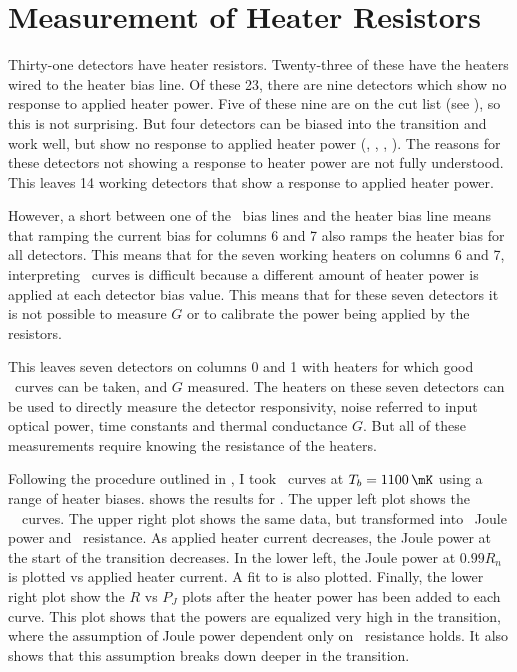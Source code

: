 \section{Measurement of Heater Resistors} \label{sec:heater-r}

Thirty-one detectors have heater resistors.
Twenty-three of these have the heaters wired to the heater bias line.
Of these 23, there are nine detectors which show no response to applied heater power.
Five of these nine are on the cut list (see ), so this is not surprising.
But four detectors can be biased into the transition and work well, but show no response to applied heater power (, , , ).
The reasons for these detectors not showing a response to heater power are not fully understood.
This leaves 14 working detectors that show a response to applied heater power.

However, a short between one of the \TES\ bias lines and the heater bias line means that ramping the current bias for columns 6 and 7 also ramps the heater bias for all detectors.
This means that for the seven working heaters on columns 6 and 7, interpreting \IV\ curves is difficult because a different amount of heater power is applied at each detector bias value.
This means that for these seven detectors it is not possible to measure $G$ or to calibrate the power being applied by the resistors.

This leaves seven detectors on columns 0 and 1 with heaters for which good \IV\ curves can be taken, and $G$ measured.
The heaters on these seven detectors can be used to directly measure the detector responsivity, noise referred to input optical power, time constants and thermal conductance $G$.
But all of these measurements require knowing the resistance of the heaters.

Following the procedure outlined in , I took \IV\ curves at $T_b = \SI{1100}{\mK}$ using a range of heater biases.
 shows the results for .
The upper left plot shows the \TES\ \IV\ curves.
The upper right plot shows the same data, but transformed into \TES\ Joule power and \TES\ resistance.
As applied heater current decreases, the Joule power at the start of the transition decreases.
In the lower left, the Joule power at $0.99R_{n}$ is plotted vs applied heater current.
A fit to  is also plotted.
Finally, the lower right plot show the $R$ vs $P_J$ plots after the heater power has been added to each curve.
This plot shows that the powers are equalized very high in the transition, where the assumption of Joule power dependent only on \TES\ resistance holds.
It also shows that this assumption breaks down deeper in the transition.

